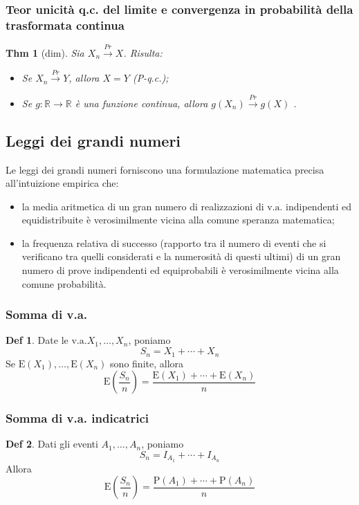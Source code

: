 \documentclass[a4paper,11pt]{article}
\theoremstyle{plain}
\newtheorem{thm}{Thm}[section]
\theoremstyle{definition}
\newtheorem{defn}{Def}[section]
\theoremstyle{remark}
\begin{document}
\subsubsection{Teor unicità q.c. del limite e convergenza in probabilità della trasformata continua}
\begin{thm}[dim] Sia $X_{n}\overset{Pr}{\rightarrow}X$. Risulta:
\begin{itemize}
    \item [(i)]  Se $X_{n}\overset{Pr}{\rightarrow}Y$, allora $X=Y$ (P-q.c.);
    \item [(ii)] Se $g:\mathbb{R}\rightarrow \mathbb{R}$ è una funzione continua, allora $g(X_{n})\overset{Pr}{\rightarrow}g(X)$ .
\end{itemize}
\end{thm}

\subsection{Leggi dei grandi numeri}
Le leggi dei grandi numeri forniscono una formulazione matematica precisa all'intuizione empirica che:
\begin{itemize}
\item  la media aritmetica di un gran numero di realizzazioni di $\mathrm{v}.\mathrm{a}$. indipendenti ed equidistribuite è verosimilmente vicina alla comune speranza matematica;
\item la frequenza relativa di successo (rapporto tra il numero di eventi che si verificano tra quelli considerati $\mathrm{e}$ la numerosità di questi ultimi) di un gran numero di prove indipendenti ed equiprobabili è verosimilmente vicina alla comune probabilità.
\end{itemize}

\subsubsection{Somma di v.a.}
\begin{defn}
Date le $\mathrm{v}.\mathrm{a}. X_{1}, \ldots, X_{n}$, poniamo
$$
S_{n}=X_{1}+\cdots+X_{n}
$$
Se $\mathrm{E}(X_{1}), \ldots, \mathrm{E}(X_{n})$ sono finite, allora
$$
\mathrm{E}\left(\frac{S_{n}}{n}\right)=\frac{\mathrm{E}(X_{1})+\cdots+\mathrm{E}(X_{n})}{n}
$$
\end{defn}

\subsubsection{Somma di v.a. indicatrici}
\begin{defn}
 Dati gli eventi $A_{1}, \ldots, A_{n}$, poniamo
$$
S_{n}=I_{A_{1}}+\cdots+I_{A_{n}}
$$
Allora
$$
\mathrm{E}\left(\frac{S_{n}}{n}\right)=\frac{\mathrm{P}(A_{1})+\cdots+\mathrm{P}(A_{n})}{n}
$$
\end{defn}
\end{document}
